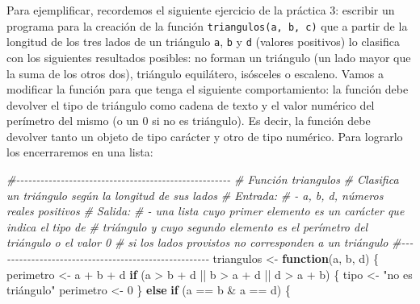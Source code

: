 \documentclass[
]{book}
\newenvironment{Shaded}{\begin{snugshade}}{\end{snugshade}}
\newcommand{\CommentTok}[1]{\textcolor[rgb]{0.56,0.35,0.01}{\textit{#1}}}
\newcommand{\ControlFlowTok}[1]{\textcolor[rgb]{0.13,0.29,0.53}{\textbf{#1}}}
\newcommand{\DecValTok}[1]{\textcolor[rgb]{0.00,0.00,0.81}{#1}}
\newcommand{\NormalTok}[1]{#1}
\newcommand{\OtherTok}[1]{\textcolor[rgb]{0.56,0.35,0.01}{#1}}
\newcommand{\SpecialCharTok}[1]{\textcolor[rgb]{0.00,0.00,0.00}{#1}}
\newcommand{\StringTok}[1]{\textcolor[rgb]{0.31,0.60,0.02}{#1}}
\begin{document}
Para ejemplificar, recordemos el siguiente ejercicio de la práctica 3: escribir un programa para la creación de la función \texttt{triangulos(a,\ b,\ c)} que a partir de la longitud de los tres lados de un triángulo \texttt{a}, \texttt{b} y \texttt{d} (valores positivos) lo clasifica con los siguientes resultados posibles: no forman un triángulo (un lado mayor que la suma de los otros dos), triángulo equilátero, isósceles o escaleno. Vamos a modificar la función para que tenga el siguiente comportamiento: la función debe devolver el tipo de triángulo como cadena de texto y el valor numérico del perímetro del mismo (o un 0 si no es triángulo). Es decir, la función debe devolver tanto un objeto de tipo carácter y otro de tipo numérico. Para lograrlo los encerraremos en una lista:

\begin{Shaded}
\begin{Highlighting}[]
\CommentTok{\#{-}{-}{-}{-}{-}{-}{-}{-}{-}{-}{-}{-}{-}{-}{-}{-}{-}{-}{-}{-}{-}{-}{-}{-}{-}{-}{-}{-}{-}{-}{-}{-}{-}{-}{-}{-}{-}{-}{-}{-}{-}{-}{-}{-}{-}{-}{-}{-}{-}{-}{-}{-}{-}}
\CommentTok{\# Función triangulos}
\CommentTok{\# Clasifica un triángulo según la longitud de sus lados}
\CommentTok{\# Entrada:}
\CommentTok{\#       {-} a, b, d, números reales positivos}
\CommentTok{\# Salida:}
\CommentTok{\#       {-} una lista cuyo primer elemento es un carácter que indica el tipo de}
\CommentTok{\#       triángulo y cuyo segundo elemento es el perímetro del triángulo o el valor 0}
\CommentTok{\#       si los lados provistos no corresponden a un triángulo}
\CommentTok{\#{-}{-}{-}{-}{-}{-}{-}{-}{-}{-}{-}{-}{-}{-}{-}{-}{-}{-}{-}{-}{-}{-}{-}{-}{-}{-}{-}{-}{-}{-}{-}{-}{-}{-}{-}{-}{-}{-}{-}{-}{-}{-}{-}{-}{-}{-}{-}{-}{-}{-}{-}{-}{-}}
\NormalTok{triangulos }\OtherTok{\textless{}{-}} \ControlFlowTok{function}\NormalTok{(a, b, d) \{}
\NormalTok{    perimetro }\OtherTok{\textless{}{-}}\NormalTok{ a }\SpecialCharTok{+}\NormalTok{ b }\SpecialCharTok{+}\NormalTok{ d}
    \ControlFlowTok{if}\NormalTok{ (a }\SpecialCharTok{\textgreater{}}\NormalTok{ b }\SpecialCharTok{+}\NormalTok{ d }\SpecialCharTok{||}\NormalTok{ b }\SpecialCharTok{\textgreater{}}\NormalTok{ a }\SpecialCharTok{+}\NormalTok{ d }\SpecialCharTok{||}\NormalTok{ d }\SpecialCharTok{\textgreater{}}\NormalTok{ a }\SpecialCharTok{+}\NormalTok{ b) \{}
\NormalTok{        tipo }\OtherTok{\textless{}{-}} \StringTok{"no es triángulo"}
\NormalTok{        perimetro }\OtherTok{\textless{}{-}} \DecValTok{0}
\NormalTok{    \} }\ControlFlowTok{else} \ControlFlowTok{if}\NormalTok{ (a }\SpecialCharTok{==}\NormalTok{ b }\SpecialCharTok{\&}\NormalTok{ a }\SpecialCharTok{==}\NormalTok{ d) \{}

\end{Highlighting}
\end{Shaded}
\end{document}
